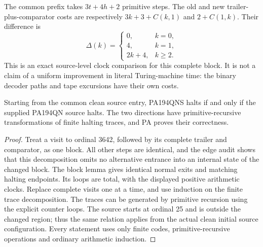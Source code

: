 The common prefix takes $3t+4h+2$ primitive steps.  The old and new
trailer-plus-comparator costs are respectively $3k+3+C(k,1)$ and
$2+C(1,k)$.  Their difference is
\[
 \Delta(k)=
 \begin{cases}0,&k=0,\\4,&k=1,\\2k+4,&k\ge2.\end{cases}
\]
This is an exact source-level clock comparison for this complete block.
It is not a claim of a uniform improvement in literal Turing-machine time:
the binary decoder paths and tape excursions have their own costs.

\begin{theorem}
Starting from the common clean source entry, PA194QNS halts if and only if
the supplied PA194QN source halts.  The two directions have
primitive-recursive transformations of finite halting traces, and PA
proves their correctness.
\end{theorem}
\begin{proof}
Treat a visit to ordinal 3642, followed by its complete trailer and
comparator, as one block.  All other steps are identical, and the edge
audit shows that this decomposition omits no alternative entrance into
an internal state of the changed block.  The block lemma gives identical
normal exits and matching halting endpoints.  Its loops are total, with
the displayed positive arithmetic clocks.  Replace complete visits one
at a time, and use induction on the finite trace decomposition.
The traces can be generated by primitive recursion using the explicit
counter loops.  The source starts at ordinal 25 and is outside the
changed region; thus the same relation applies from the actual clean
initial source configuration.  Every statement uses only finite codes,
primitive-recursive operations and ordinary arithmetic induction.
\end{proof}

